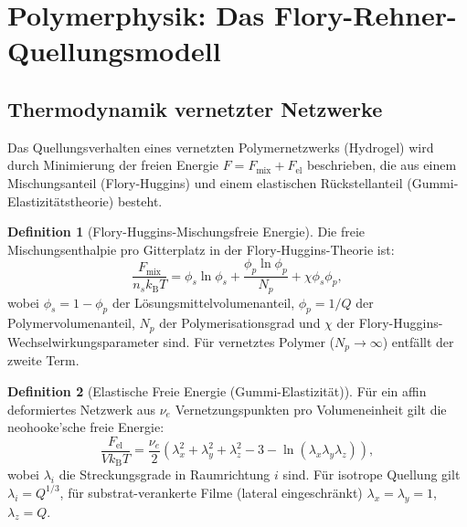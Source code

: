 ﻿\documentclass[a4paper,12pt]{article}
\theoremstyle{definition}
\newtheorem{definition}{Definition}[section]
\begin{document}
	\section{Polymerphysik: Das Flory-Rehner-Quellungsmodell}
	\label{sec:polymer}
	
	\subsection{Thermodynamik vernetzter Netzwerke}
	
	Das Quellungsverhalten eines vernetzten Polymernetzwerks (Hydrogel) wird durch
	Minimierung der freien Energie $F = F_\mathrm{mix} + F_\mathrm{el}$
	beschrieben, die aus einem Mischungsanteil (Flory-Huggins) und einem elastischen
	Rückstellanteil (Gummi-Elastizitätstheorie) besteht.
	
	\begin{definition}[Flory-Huggins-Mischungsfreie Energie]
		\label{def:flory-huggins}
		Die freie Mischungsenthalpie pro Gitterplatz in der Flory-Huggins-Theorie ist:
		\begin{equation}
			\frac{F_\mathrm{mix}}{n_s k_\mathrm{B}T} = \phi_s \ln\phi_s + \frac{\phi_p \ln\phi_p}{N_p}
			+ \chi \phi_s \phi_p,
			\label{eq:flory-huggins}
		\end{equation}
		wobei $\phi_s = 1 - \phi_p$ der Lösungsmittelvolumenanteil, $\phi_p = 1/Q$
		der Polymervolumenanteil, $N_p$ der Polymerisationsgrad und $\chi$ der
		Flory-Huggins-Wechselwirkungsparameter sind.
		Für vernetztes Polymer ($N_p \to \infty$) entfällt der zweite Term.
	\end{definition}
	
	\begin{definition}[Elastische Freie Energie (Gummi-Elastizität)]
		\label{def:elastizitaet}
		Für ein affin deformiertes Netzwerk aus $\nu_e$ Vernetzungspunkten
		pro Volumeneinheit gilt die neohooke'sche freie Energie:
		\begin{equation}
			\frac{F_\mathrm{el}}{Vk_\mathrm{B}T} = \frac{\nu_e}{2}\left(
			\lambda_x^2 + \lambda_y^2 + \lambda_z^2 - 3 - \ln(\lambda_x\lambda_y\lambda_z)
			\right),
			\label{eq:elastizitaet}
		\end{equation}
		wobei $\lambda_i$ die Streckungsgrade in Raumrichtung $i$ sind.
		Für isotrope Quellung gilt $\lambda_i = Q^{1/3}$, für substrat-verankerte
		Filme (lateral eingeschränkt) $\lambda_x = \lambda_y = 1$, $\lambda_z = Q$.
	\end{definition}
	
\end{document}
